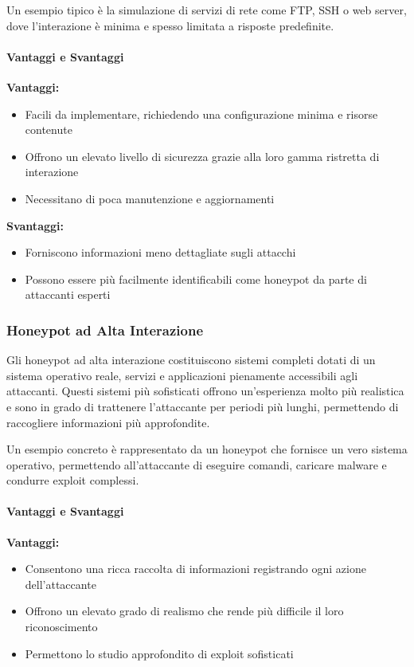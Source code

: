 Un esempio tipico è la simulazione di servizi di rete come FTP, SSH o web server, dove l'interazione è minima e spesso limitata a risposte predefinite.

\paragraph{Vantaggi e Svantaggi}

\textbf{Vantaggi:}
\begin{itemize}
    \item Facili da implementare, richiedendo una configurazione minima e risorse contenute
    \item Offrono un elevato livello di sicurezza grazie alla loro gamma ristretta di interazione
    \item Necessitano di poca manutenzione e aggiornamenti
\end{itemize}

\textbf{Svantaggi:}
\begin{itemize}
    \item Forniscono informazioni meno dettagliate sugli attacchi
    \item Possono essere più facilmente identificabili come honeypot da parte di attaccanti esperti
\end{itemize}

\subsubsection{Honeypot ad Alta Interazione}

Gli honeypot ad alta interazione costituiscono sistemi completi dotati di un sistema operativo reale, servizi e applicazioni pienamente accessibili agli attaccanti. Questi sistemi più sofisticati offrono un'esperienza molto più realistica e sono in grado di trattenere l'attaccante per periodi più lunghi, permettendo di raccogliere informazioni più approfondite.

Un esempio concreto è rappresentato da un honeypot che fornisce un vero sistema operativo, permettendo all'attaccante di eseguire comandi, caricare malware e condurre exploit complessi.

\paragraph{Vantaggi e Svantaggi}

\textbf{Vantaggi:}
\begin{itemize}
    \item Consentono una ricca raccolta di informazioni registrando ogni azione dell'attaccante
    \item Offrono un elevato grado di realismo che rende più difficile il loro riconoscimento
    \item Permettono lo studio approfondito di exploit sofisticati
\end{itemize}

